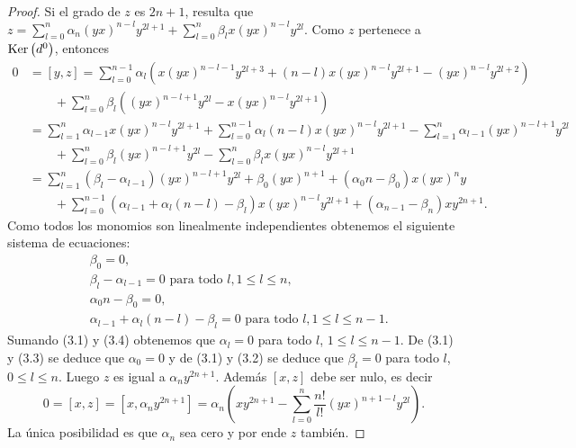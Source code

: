 \documentclass[fleqn,../tesis.tex]{subfiles}
\begin{document}
\begin{proof}
    Si el grado de $z$ es $2n + 1$, resulta que
    $z = \sum_{l = 0}^{n}\alpha_n (yx)^{n - l}y^{2l + 1} + \sum_{l = 0}^{n}\beta_l x (yx)^{n - l}y^{2l}$.
    Como $z$ pertenece a $\operatorname{Ker}\left(d^{0}\right)$, entonces
    \begin{align*}
        0 &= [y,z] = \sum_{l = 0}^{n - 1}\alpha_l \left(x (yx)^{n - l - 1}y^{2l + 3}
            + (n - l)x(yx)^{n - l}y^{2l + 1} - (yx)^{n - l}y^{2l + 2}\right) \\
        &\qquad + \sum_{l = 0}^{n}\beta_l\left((yx)^{n - l + 1}y^{2l} - x(yx)^{n - l}y^{2l + 1}\right)\\
        & = \sum_{l = 1}^{n}\alpha_{l - 1} x (yx)^{n - l}y^{2l + 1} + \sum_{l = 0}^{n - 1}\alpha_l (n - l)x(yx)^{n - l}y^{2l + 1}
           -\sum_{l = 1}^{n}\alpha_{l - 1}(yx)^{n - l + 1}y^{2l}\\
        &\qquad + \sum_{l = 0}^{n}\beta_l (yx)^{n - l + 1}y^{2l} -\sum_{l = 0}^{n}\beta_l x(yx)^{n - l}y^{2l + 1} \\
        &= \sum_{l = 1}^{n}\left(\beta_l - \alpha_{l - 1}\right)(yx)^{n - l + 1}y^{2l} + \beta_0 (yx)^{n + 1}
            + \left(\alpha_0 n - \beta_0\right)x(yx)^{n}y\\
        &\qquad + \sum_{l = 0}^{n - 1}\left(\alpha_{l - 1} + \alpha_l(n - l) - \beta_l\right)x(yx)^{n - l}y^{2l + 1}
            +\left(\alpha_{n - 1} - \beta_n \right)xy^{2n + 1}.
    \end{align*}
    Como todos los monomios son linealmente independientes obtenemos el siguiente sistema de ecuaciones:
    \begin{align}
        &\beta_0 = 0,\\
        &\beta_l - \alpha_{l - 1} = 0 \text{ para todo } l, 1 \leq l \leq n,\\
        &\alpha_0 n - \beta_0 = 0,\\
        &\alpha_{l - 1} +  \alpha_l(n - l) -\beta_l = 0 \text{ para todo } l, 1 \leq l \leq n - 1.
    \end{align}
    Sumando (3.1) y (3.4) obtenemos que $\alpha_l = 0$ para todo $l$, $1 \leq l \leq n - 1$. De (3.1) y (3.3) se deduce que $\alpha_0 = 0$
    y de (3.1) y (3.2) se deduce que $\beta_l = 0$ para todo $l$, $0\leq l \leq n$. Luego $z$ es igual a $\alpha_n y^{2n + 1}$. Además
    $[x, z]$ debe ser nulo, es decir
    \[
        0 = [x, z] = [x, \alpha_n y^{2n + 1}] = \alpha_n \left(xy^{2n + 1} - \sum_{l = 0}^{n}\frac{n!}{l!}(yx)^{n + 1- l}y^{2l}\right).
    \]
    La única posibilidad es que $\alpha_n$ sea cero y por ende $z$ también.
\end{proof}
\end{document}
